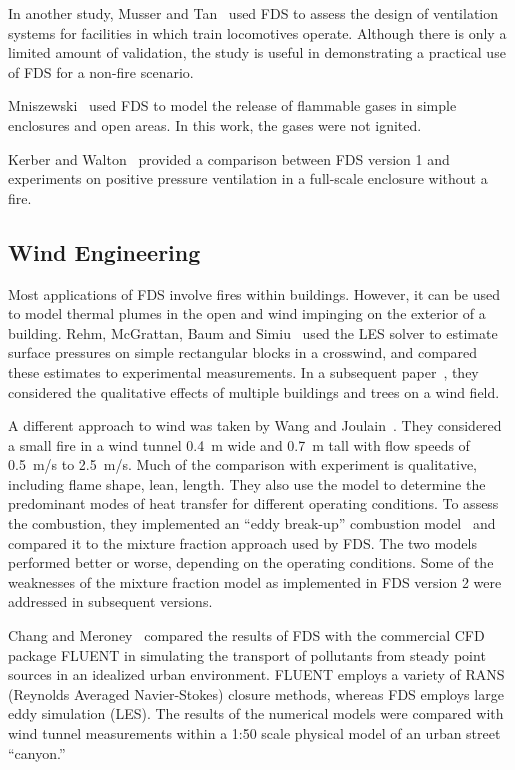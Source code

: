 In another study, Musser and Tan~\cite{Musser:2} used FDS to assess the design of ventilation systems for facilities in which train locomotives operate. Although there is only a limited amount of validation, the study is useful in demonstrating a practical use of FDS for a non-fire scenario.

Mniszewski~\cite{Mniszewski:1} used FDS to model the release of flammable gases in simple enclosures and open areas. In this work, the gases were not ignited.

Kerber and Walton~\cite{Kerber:1} provided a comparison between FDS version 1 and experiments on positive pressure ventilation in a full-scale enclosure without a fire.


\subsection{Wind Engineering}

Most applications of FDS involve fires within buildings. However, it can be used to model thermal plumes in the open and wind impinging on the exterior  of  a  building.  Rehm,  McGrattan,  Baum  and Simiu~\cite{LES:4} used the LES solver to estimate surface pressures on simple rectangular blocks in a crosswind, and compared these estimates to experimental measurements. In a subsequent paper~\cite{Rehm:WS02}, they considered the qualitative effects of multiple buildings and trees on a wind field.

A  different  approach  to  wind  was  taken  by  Wang  and Joulain~\cite{Wang:IAFSS2002}. They considered a small fire in a wind tunnel 0.4~m wide and 0.7~m tall with flow speeds of 0.5~m/s to 2.5~m/s. Much of the comparison with experiment is qualitative, including flame shape, lean, length. They also use the model to determine the predominant modes of heat transfer for different operating conditions. To assess the combustion, they implemented an ``eddy break-up'' combustion model~\cite{Magnussen:1} and compared it to the mixture fraction approach used by FDS. The two models performed better or worse, depending on the operating conditions. Some of the weaknesses of the mixture fraction model as implemented in FDS version 2 were addressed in subsequent versions.

Chang and Meroney~\cite{ChangJWE2003} compared the results of FDS with the commercial CFD package FLUENT in simulating the transport of pollutants  from steady  point sources  in an  idealized urban environment. FLUENT employs a variety of RANS (Reynolds Averaged Navier-Stokes) closure methods,  whereas FDS employs large eddy simulation (LES).  The results of the numerical models were compared with wind tunnel measurements within a 1:50 scale physical model of an urban street ``canyon.''


